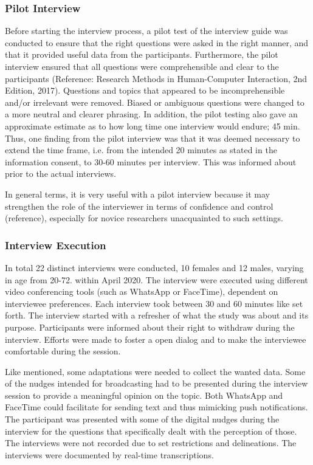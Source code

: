         \subsubsection{Pilot Interview}
        Before starting the interview process, a pilot test of the interview guide was conducted to ensure that the right questions were asked in the right manner, and that it provided useful data from the participants.  Furthermore, the pilot interview ensured that all questions were comprehensible and clear to  the  participants (Reference:  Research Methods in Human-Computer Interaction, 2nd Edition, 2017).  Questions and topics that appeared to be incomprehensible and/or irrelevant were removed. Biased or ambiguous questions were changed to a more neutral and clearer phrasing. In addition, the pilot testing also gave an approximate estimate as to how long time one interview would endure; 45 min. Thus, one finding from the pilot interview was that it was deemed necessary to extend the time frame, i.e. from the intended 20 minutes as stated in the information consent, to 30-60 minutes per interview. This was informed about prior to the actual interviews.
        
        In general terms, it is very useful with a pilot interview because it may strengthen the role of the interviewer in terms of confidence and control (reference), especially for novice researchers unacquainted to such settings. 
        
        \subsubsection{Interview Execution}
        In total 22 distinct interviews were conducted, 10 females and 12 males, varying in age from 20-72. within April 2020.  The interview were executed using different video conferencing tools (such as WhatsApp or FaceTime), dependent on interviewee preferences. Each interview took between 30 and 60 minutes like set forth. The interview started with a refresher of what the study was about and its purpose. Participants were informed about their right to withdraw during the interview. Efforts were made to foster a open dialog and to make the interviewee comfortable during the session. 
 
        Like mentioned, some adaptations were needed to collect the wanted data. Some of the nudges intended for broadcasting had to be presented during the interview session to provide a meaningful opinion on the topic. Both WhatsApp and FaceTime could facilitate for sending text and thus mimicking push notifications. The participant was presented with some of the digital nudges during the interview for the questions that specifically dealt with the perception of those.
        The interviews were not recorded due to set restrictions and delineations. The interviews were documented by real-time transcriptions. 

